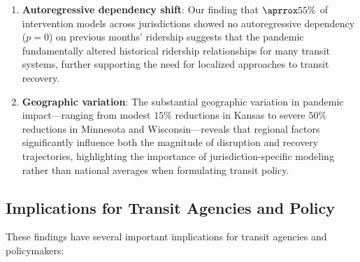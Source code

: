 \documentclass[11pt]{article}
\begin{document}
\begin{enumerate}
\item \textbf{Autoregressive dependency shift}: Our finding that $\aprrox 55\%$ of intervention models across jurisdictions showed no autoregressive dependency ($p = 0$) on previous months' ridership suggests that the pandemic fundamentally altered historical ridership relationships for many transit systems, further supporting the need for localized approaches to transit recovery.

\item \textbf{Geographic variation}: The substantial geographic variation in pandemic impact—ranging from modest $15\%$ reductions in Kansas to severe $50\%$ reductions in Minnesota and Wisconsin—reveals that regional factors significantly influence both the magnitude of disruption and recovery trajectories, highlighting the importance of jurisdiction-specific modeling rather than national averages when formulating transit policy.

\end{enumerate}

\subsection{Implications for Transit Agencies and Policy}

These findings have several important implications for transit agencies and policymakers:
\end{document}
